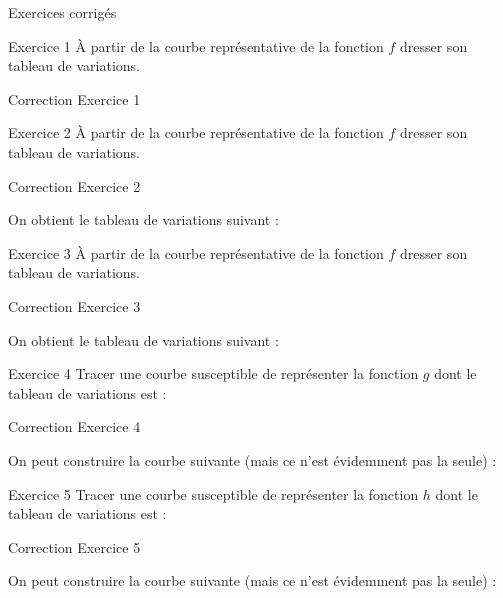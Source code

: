 Exercices corrigés

Exercice 1
À partir de la courbe représentative de la fonction $f$ dresser son tableau de variations.

Correction Exercice 1

Exercice 2
À partir de la courbe représentative de la fonction $f$ dresser son tableau de variations.

Correction Exercice 2

On obtient le tableau de variations suivant :

Exercice 3
À partir de la courbe représentative de la fonction $f$ dresser son tableau de variations.


Correction Exercice 3

On obtient le tableau de variations suivant :

Exercice 4
Tracer une courbe susceptible de représenter la fonction $g$ dont le tableau de variations est :


Correction Exercice 4


On peut construire la courbe suivante (mais ce n'est évidemment pas la seule) :

Exercice 5
Tracer une courbe susceptible de représenter la fonction $h$ dont le tableau de variations est :

Correction Exercice 5


On peut construire la courbe suivante (mais ce n'est évidemment pas la seule) :
